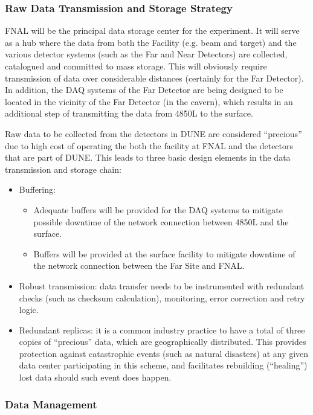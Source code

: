 \subsubsection{Raw Data Transmission and Storage Strategy}
FNAL will be the principal data storage center for the experiment. It will serve as a hub where the data from both the Facility (e.g. beam and target)
and the various detector systems (such as the  Far and Near Detectors)  are collected, catalogued and committed to mass storage. This will obviously require transmission of
data over considerable distances (certainly for the Far Detector). In addition, the DAQ systems of the Far Detector are being designed to be located  in the vicinity of
the Far Detector (in the cavern), which results in an additional step of transmitting the data from 4850L to the surface.

Raw data to be collected from the detectors in DUNE are considered ``precious'' due to high cost of operating the both the facility at FNAL
and the detectors that are part of DUNE. This leads to three basic design elements in the data transmission and storage chain:
\begin{itemize}
\item Buffering:
\begin{itemize}
\item Adequate buffers will be provided for the DAQ systems  to mitigate possible downtime of the network connection between 4850L and the surface.
\item Buffers will be provided at the surface facility to mitigate downtime of the network connection between the Far Site and FNAL.
\end{itemize}
\item Robust transmission: data transfer needs to be instrumented with redundant checks (such as checksum calculation), monitoring, error correction and retry logic.
\item Redundant replicas: it is a common industry practice to have a total of three copies of ``precious'' data, which are geographically distributed. This provides protection against catastrophic events (such as natural disasters) at any given data center participating in this scheme, and facilitates rebuilding (``healing'')  lost data should such event does happen.
\end{itemize}



\subsubsection{Data Management}
\label{sec:detectors-sc-infrastructure-computing-model-data-mgt}

